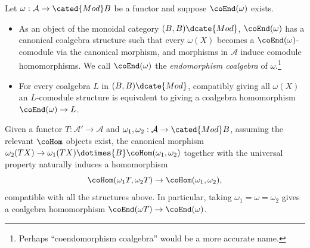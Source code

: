 \begin{definition-proposition}\label{def:cogebra-L}
	Let $\omega:\mathcal{A}\to\cated{Mod}B$ be a functor and suppose
	$\coEnd(\omega)$ exists.
	\begin{itemize}
		\item As an object of the monoidal category $(B,B)\dcate{Mod}$,
		$\coEnd(\omega)$ has a canonical coalgebra structure such that every
		$\omega(X)$ becomes a $\coEnd(\omega)$-comodule via the canonical
		morphism, and morphisms in $\mathcal{A}$ induce comodule
		homomorphisms. We call $\coEnd(\omega)$ the \emph{endomorphism
		coalgebra} of $\omega$.\footnote{Perhaps ``coendomorphism coalgebra''
		would be a more accurate name.}
		\item For every coalgebra $L$ in $(B,B)\dcate{Mod}$, compatibly giving
		all $\omega(X)$ an $L$-comodule structure is equivalent to giving a
		coalgebra homomorphism $\coEnd(\omega)\to L$.
	\end{itemize}
\end{definition-proposition}

\begin{remark}\label{rem:L-cogebra-functoriality}
	Given a functor $T:\mathcal{A}'\to\mathcal{A}$ and
	$\omega_1,\omega_2:\mathcal{A}\to\cated{Mod}B$, assuming the relevant
	$\coHom$ objects exist, the canonical morphism
	$\omega_2(TX)\to\omega_1(TX)\dotimes{B}\coHom(\omega_1,\omega_2)$
	together with the universal property naturally induces a homomorphism
	\[ \coHom(\omega_1 T, \omega_2 T) \to \coHom(\omega_1, \omega_2), \]
	compatible with all the structures above. In particular, taking
	$\omega_1=\omega=\omega_2$ gives a coalgebra homomorphism
	$\coEnd(\omega T)\to\coEnd(\omega)$.
\end{remark}

